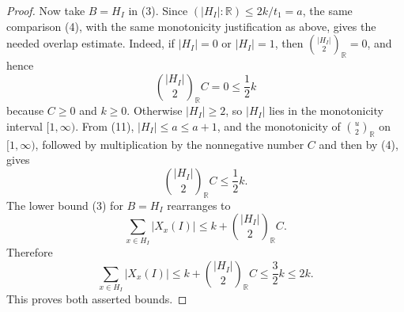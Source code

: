\begin{proof}
Now take \(B=H_I\) in (3).  Since
\((|H_I|:\mathbb R)\le2k/t_1=a\), the same comparison (4), with the same
monotonicity justification as above, gives the needed overlap estimate.
Indeed, if \(|H_I|=0\) or \(|H_I|=1\), then
\(\binom{|H_I|}{2}_{\mathbb R}=0\), and hence
\[
\binom{|H_I|}{2}_{\mathbb R}C=0\le\frac12k
\]
because \(C\ge0\) and \(k\ge0\).  Otherwise \(|H_I|\ge2\), so
\(|H_I|\) lies in the monotonicity interval \([1,\infty)\).  From (11),
\(|H_I|\le a\le a+1\), and the monotonicity of
\(\binom u2_{\mathbb R}\) on \([1,\infty)\), followed by multiplication by
the nonnegative number \(C\) and then by (4), gives
\[
\binom{|H_I|}{2}_{\mathbb R}C\le\frac12k.
\]
The lower bound (3) for \(B=H_I\) rearranges to
\[
\sum_{x\in H_I}|X_x(I)|
\le k+\binom{|H_I|}{2}_{\mathbb R}C.
\]
Therefore
\[
\sum_{x\in H_I}|X_x(I)|
\le k+\binom{|H_I|}{2}_{\mathbb R}C
\le \frac32k\le2k.
\]
This proves both asserted bounds.
\end{proof}
